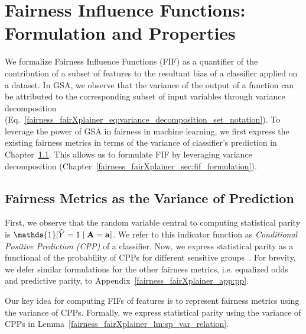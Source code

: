 \section{Fairness Influence Functions: Formulation and Properties}\label{fairness_fairXplainer_sec:fifs}
We formalize Fairness Influence Functions (FIF) as a quantifier of the contribution of a subset of features to the resultant bias of a classifier applied on a dataset.  In GSA, we observe that the variance of the output of a function can be attributed to the corresponding subset of input variables through variance decomposition (Eq.~\eqref{fairness_fairXplainer_eq:variance_decomposition_set_notation}). To leverage the power of GSA in fairness in machine learning, we first express the existing fairness metrics in terms of the variance of classifier's prediction in Chapter~\ref{fairness_fairXplainer_sec:metric_as_variance}. This allows us to formulate FIF by leveraging variance decomposition (Chapter~\ref{fairness_fairXplainer_sec:fif_formulation}). 


\subsection{Fairness Metrics as the Variance of Prediction}
\label{fairness_fairXplainer_sec:metric_as_variance}

First, we observe that the random variable central to computing statistical parity is $ \mathds{1}[\widehat{Y} = 1 \mid \sensitive = \mathbf{a}] $.
We refer to this indicator function as \textit{Conditional Positive Prediction (CPP)} of a classifier. Now, we express statistical parity as a functional of the probability of CPPs for different sensitive groups~\cite{benesse2021fairness}. For brevity, we defer similar formulations for the other fairness metrics, i.e. equalized odds and predictive parity, to Appendix~\ref{fairness_fairXplainer_app:pp}. %

Our key idea for computing FIFs of features is to represent fairness metrics using the variance of CPPs. Formally, we express statistical parity using the variance of CPPs in Lemma~\ref{fairness_fairXplainer_lm:sp_var_relation}.

